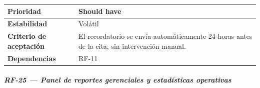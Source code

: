 \documentclass[
]{article}
\begin{document}
{\begin{longtable}[]{|
  >{\raggedright\arraybackslash}p{}|
  >{\raggedright\arraybackslash}p{}|}
\hline
\textbf{Prioridad} & \begin{minipage}[t]{\linewidth}\raggedright
Should have
\end{minipage} \\
\hline
\textbf{Estabilidad} & \begin{minipage}[t]{\linewidth}\raggedright
Volátil
\end{minipage} \\
\hline
\textbf{Criterio de aceptación} &
\begin{minipage}[t]{\linewidth}\raggedright
El recordatorio se envía automáticamente 24 horas antes de la cita, sin intervención manual.
\end{minipage} \\
\hline
\textbf{Dependencias} & \begin{minipage}[t]{\linewidth}\raggedright
RF-11
\end{minipage} \\
\hline
\end{longtable}
}

\subparagraph{RF-25 --- Panel de reportes gerenciales y estadísticas operativas}\label{rf-25-panel-de-reportes-gerenciales-y-estad-st}
\end{document}

